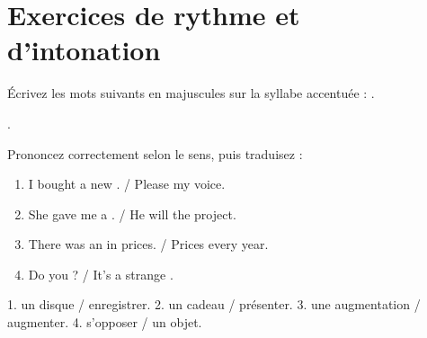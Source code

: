 \section{Exercices de rythme et d'intonation}

\begin{exo}
Écrivez les mots suivants en majuscules sur la syllabe accentuée :
.
\end{exo}
\begin{corrige}[6.1]
.
\end{corrige}

\begin{exo}
Prononcez correctement selon le sens, puis traduisez :
\begin{enumerate}
  \item I bought a new . / Please  my voice.
  \item She gave me a . / He will  the project.
  \item There was an  in prices. / Prices  every year.
  \item Do you ? / It's a strange .
\end{enumerate}
\end{exo}
\begin{corrige}[6.2]
1.  un disque /  enregistrer. 2.  un cadeau /
 présenter. 3.  une augmentation /  augmenter.
4.  s'opposer /  un objet.
\end{corrige}

